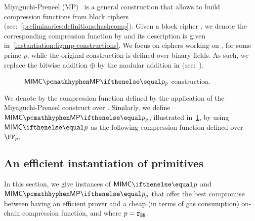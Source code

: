 Miyaguchi-Preneel (MP)~\cite[$f_3$ function]{black2002black} is a general construction that allows to build compression functions from block ciphers (see:~\cref{preliminaries:definitions:hashcomp}). Given a block cipher \Enc, we denote the corresponding compression function by \fMP{} and its description is given in~\cref{instantiation:fig:mp-constructions}. We focus on ciphers working on , for some prime $p$, while the original construction is defined over binary fields. As such, we replace the bitwise addition $\oplus$ by the modular addition in \FFx{\rBN} (see:~\cite{mp-security-ethsnarks}).

\begin{figure*}[ht]
    \begin{minipage}[t]{0.50\textwidth}
        \caption{\MP{} construct in $\FFx{p}$.}\label{instantiation:fig:mp-constructions}
    \end{minipage}%
    \begin{minipage}[t]{0.50\textwidth}
    \caption{$\mimcMPPrime{p}$ construction.}\label{instantiation:fig:mimc-mp-constructions}
    \end{minipage}%
\end{figure*}

We denote by \mimcMP{} the compression function defined by the application of the Miyaguchi-Preneel construct over \mimc{}. Similarly, we define $\mimcMPPrime{p}$, illustrated in~\cref{instantiation:fig:mimc-mp-constructions}, by using $\mimcPrime{p}$ as the following compression function defined over $\FFx{p}$,

\subsection{An efficient instantiation of \mimc{} primitives}\label{instantiation:mkhash:efficient-instance}

In this section, we give instances of $\mimcPrime{p}$ and $\mimcMPPrime{p}$ that offer the best compromise between having an efficient prover and a cheap (in terms of gas consumption) on-chain compression function, and where $p=\mathtt{r_{BN}}$.

